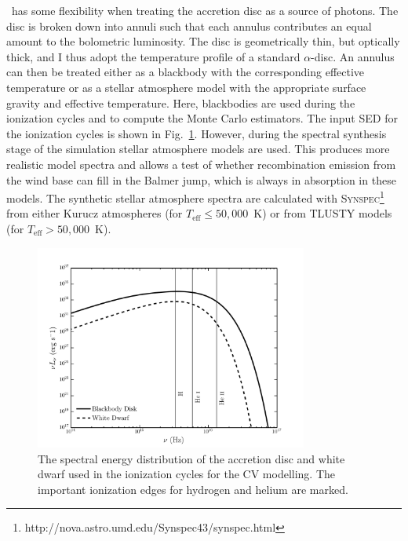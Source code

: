 \py\ has some flexibility when treating the accretion 
disc as a source of photons. The disc is broken down into annuli 
such that each annulus contributes an equal amount to the bolometric
luminosity. The disc is geometrically thin, but optically
thick, and I thus adopt the temperature profile of a standard
\cite{shakurasunyaev1973} $\alpha$-disc. An annulus can then
be treated either as a blackbody with the corresponding effective
temperature or as a stellar atmosphere model with the appropriate
surface gravity and effective temperature. Here, blackbodies are used
during the ionization cycles and to compute the Monte Carlo
estimators. The input SED for the ionization cycles is shown in 
Fig.~\ref{cv_model_sed}.
However, during the spectral synthesis stage of the 
simulation stellar atmosphere models are used. This produces more
realistic model spectra and allows a test of whether recombination
emission from the wind base can fill in the Balmer jump, which is
always in absorption in these models. 
The synthetic stellar atmosphere spectra are calculated with
\textsc{Synspec}\footnote{http://nova.astro.umd.edu/Synspec43/synspec.html}
from either Kurucz \citep{kurucz1991} atmospheres (for $T_{\mathrm{eff}} \leq
50,000$~K) or from \textsc{TLUSTY} \citep{tlusty} models (for $T_{\mathrm{eff}} > 50,000$~K). 


\begin{figure} 
\centering
\includegraphics[width=0.8\textwidth]{figures/05-cvpaper/sed.png}
\caption[The spectral energy distribution of the 
accretion disc and white dwarf used in the ionization cycles for
the CV modelling.]{The spectral energy distribution of the 
accretion disc and white dwarf used in the ionization cycles for
the CV modelling. The important ionization edges for
hydrogen and helium are marked.}
\label{cv_model_sed}
\end{figure} 

